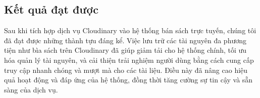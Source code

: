 \documentclass[../DoAn.tex]{subfiles}
\begin{document}
\subsection{Kết quả đạt được}
Sau khi tích hợp dịch vụ Cloudinary vào hệ thống bán sách trực tuyến, chúng tôi đã đạt được những thành tựu đáng kể. Việc lưu trữ các tài nguyên đa phương tiện như bìa sách trên Cloudinary đã giúp giảm tải cho hệ thống chính, tối ưu hóa quản lý tài nguyên, và cải thiện trải nghiệm người dùng bằng cách cung cấp truy cập nhanh chóng và mượt mà cho các tài liệu. Điều này đã nâng cao hiệu quả hoạt động và đáp ứng của hệ thống, đồng thời tăng cường sự tin cậy và sẵn sàng của dịch vụ.
\end{document}
